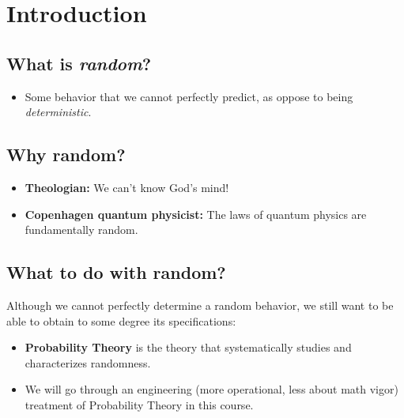 
\section{Introduction}
\subsection{What is \emph{random}?}
\begin{itemize}
  \item Some behavior that we cannot perfectly predict, as oppose to
    being \emph{deterministic}.
\end{itemize}

\subsection{Why random?}
\begin{itemize}
\item \textbf{Theologian:}  We can't know God's mind! 
\item \textbf{Copenhagen quantum physicist:} The laws of quantum physics are fundamentally random.
\end{itemize}
  
\subsection{What to do with random?}
Although we cannot perfectly determine a random behavior, we still want to be
able to obtain to some degree its specifications:
\begin{itemize}
  \item \textbf{Probability Theory} is the theory that systematically studies and characterizes randomness.
  \item We will go through an engineering (more operational, less
    about math vigor) treatment of Probability Theory in this course.
\end{itemize}


